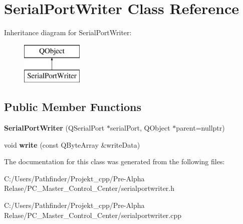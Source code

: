 \hypertarget{class_serial_port_writer}{}\section{Serial\+Port\+Writer Class Reference}
\label{class_serial_port_writer}
Inheritance diagram for Serial\+Port\+Writer\+:\begin{figure}[H]
\begin{center}
\leavevmode
\includegraphics[height=2.000000cm]{class_serial_port_writer}
\end{center}
\end{figure}
\subsection*{Public Member Functions}
\begin{DoxyCompactItemize}
\item 
\mbox{\label{class_serial_port_writer_a3b5369d4b5e6aba6da90b94fdde1f5d1}} 
{\bfseries Serial\+Port\+Writer} (Q\+Serial\+Port $\ast$serial\+Port, Q\+Object $\ast$parent=nullptr)
\item 
\mbox{\label{class_serial_port_writer_a3dfddb3494badc0f271bd0df18851061}} 
void {\bfseries write} (const Q\+Byte\+Array \&write\+Data)
\end{DoxyCompactItemize}


The documentation for this class was generated from the following files\+:\begin{DoxyCompactItemize}
\item 
C\+:/\+Users/\+Pathfinder/\+Projekt\+\_\+cpp/\+Pre-\/\+Alpha Relase/\+P\+C\+\_\+\+Master\+\_\+\+Control\+\_\+\+Center/serialportwriter.\+h\item 
C\+:/\+Users/\+Pathfinder/\+Projekt\+\_\+cpp/\+Pre-\/\+Alpha Relase/\+P\+C\+\_\+\+Master\+\_\+\+Control\+\_\+\+Center/serialportwriter.\+cpp\end{DoxyCompactItemize}
